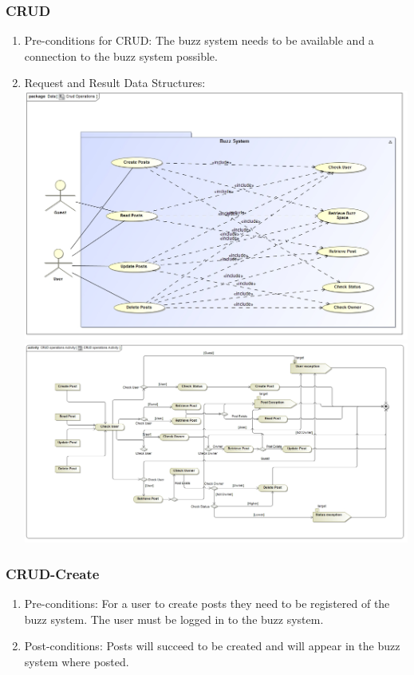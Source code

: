 \documentclass[12pt, oneside]{book}
\begin{document}
\subsubsection{CRUD}
\begin{enumerate}
 \item Pre-conditions for CRUD: The buzz system needs to be available and a connection to the buzz system possible.
 
  \item Request and Result Data Structures: \\
 \includegraphics[scale=0.3]{CRUDOperations}\\
 \includegraphics[scale=0.3]{CRUDOperationsActivity} 
\end{enumerate}
\subsubsection{CRUD-Create}
\begin{enumerate}
 \item Pre-conditions: For a user to create posts they need to be registered of the buzz system. The user must be logged in to the buzz system.
 \\
 \item Post-conditions: Posts will succeed to be created and will appear in the buzz system where posted.
  \\
 
\end{enumerate}
\end{document}
